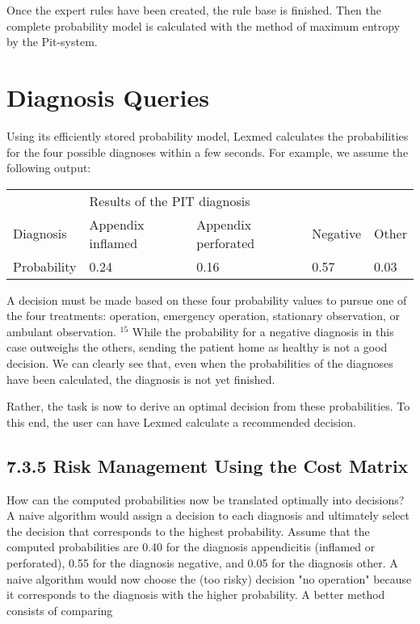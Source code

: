 \documentclass[10pt]{article}
\begin{document}
Once the expert rules have been created, the rule base is finished. Then the complete probability model is calculated with the method of maximum entropy by the Pit-system.

\section*{Diagnosis Queries}
Using its efficiently stored probability model, Lexmed calculates the probabilities for the four possible diagnoses within a few seconds. For example, we assume the following output:

\begin{center}
\begin{tabular}{lllll}
\hline
 & \multicolumn{4}{l}{Results of the PIT diagnosis} \\
\cline { 2 - 5 }
Diagnosis & Appendix inflamed & Appendix perforated & Negative & Other \\
\hline
Probability & 0.24 & 0.16 & 0.57 & 0.03 \\
\hline
\end{tabular}
\end{center}

A decision must be made based on these four probability values to pursue one of the four treatments: operation, emergency operation, stationary observation, or ambulant observation. ${ }^{15}$ While the probability for a negative diagnosis in this case outweighs the others, sending the patient home as healthy is not a good decision. We can clearly see that, even when the probabilities of the diagnoses have been calculated, the diagnosis is not yet finished.

Rather, the task is now to derive an optimal decision from these probabilities. To this end, the user can have Lexmed calculate a recommended decision.

\subsection*{7.3.5 Risk Management Using the Cost Matrix}
How can the computed probabilities now be translated optimally into decisions? A naive algorithm would assign a decision to each diagnosis and ultimately select the decision that corresponds to the highest probability. Assume that the computed probabilities are 0.40 for the diagnosis appendicitis (inflamed or perforated), 0.55 for the diagnosis negative, and 0.05 for the diagnosis other. A naive algorithm would now choose the (too risky) decision "no operation" because it corresponds to the diagnosis with the higher probability. A better method consists of comparing
\end{document}
